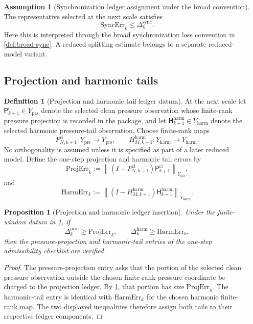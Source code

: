 \documentclass[11pt]{article}
\numberwithin{equation}{section}
\theoremstyle{plain}
\newtheorem{proposition}[theorem]{Proposition}
\theoremstyle{definition}
\newtheorem{definition}[theorem]{Definition}
\newtheorem{assumption}[theorem]{Assumption}
\theoremstyle{remark}
\newcommand{\cl}{\mathrm{cl}}
\newcommand{\prs}{\mathrm{prs}}
\newcommand{\harm}{\mathrm{harm}}
\newcommand{\proj}{\mathrm{proj}}
\newcommand{\sync}{\mathrm{sync}}
\newcommand{\norm}[1]{\left\lVert #1\right\rVert}
\begin{document}
\begin{assumption}[Synchronization ledger assignment under the broad convention]\label{ass:sync}
The representative selected at the next scale satisfies
\[
  \mathrm{SyncErr}_k
  \le
  \Delta_k^{\sync}.
\]
Here this is interpreted through the broad synchronization loss convention
in \cref{def:broad-sync}.  A reduced splitting estimate belongs to a
separate reduced-model variant.
\end{assumption}

\subsection{Projection and harmonic tails}

\begin{definition}[Projection and harmonic tail ledger datum]
\label{def:proj-harm-datum}
At the next scale let \(\mathsf P_{k+1}^{\cl}\in Y_{\prs}\) denote the
selected clean pressure observation whose finite-rank pressure projection is
recorded in the package, and let
\(\mathsf H_{k+1}^{\harm}\in Y_{\harm}\) denote the selected harmonic
pressure-tail observation.  Choose finite-rank maps
\[
  P_{N,k+1}^{\cl}:Y_{\prs}\to Y_{\prs},
  \qquad
  H_{M,k+1}^{\harm}:Y_{\harm}\to Y_{\harm}.
\]
No orthogonality is assumed unless it is specified as part of a later reduced
model.  Define the one-step projection and harmonic tail errors by
\[
  \mathrm{ProjErr}_k
  :=
  \norm{(I-P_{N,k+1}^{\cl})\mathsf P_{k+1}^{\cl}}_{Y_{\prs}},
\]
and
\[
  \mathrm{HarmErr}_k
  :=
  \norm{(I-H_{M,k+1}^{\harm})\mathsf H_{k+1}^{\harm}}_{Y_{\harm}}.
\]
\end{definition}

\begin{proposition}[Projection and harmonic ledger insertion]
\label{prop:proj-harm-insertion}
Under the finite-window datum in \cref{def:proj-harm-datum}, if
\[
  \Delta_k^{\proj}\ge \mathrm{ProjErr}_k,
  \qquad
  \Delta_k^{\harm}\ge \mathrm{HarmErr}_k,
\]
then the pressure-projection and harmonic-tail entries of the one-step
admissibility checklist are verified.
\end{proposition}

\begin{proof}
The pressure-projection entry asks that the portion of the selected clean
pressure observation outside the chosen finite-rank pressure coordinate be
charged to the projection ledger.  By \cref{def:proj-harm-datum}, that portion
has size \(\mathrm{ProjErr}_k\).  The harmonic-tail entry is identical with
\(\mathrm{HarmErr}_k\) for the chosen harmonic finite-rank map.  The two
displayed inequalities therefore assign both tails to their respective
ledger components.
\end{proof}
\end{document}
